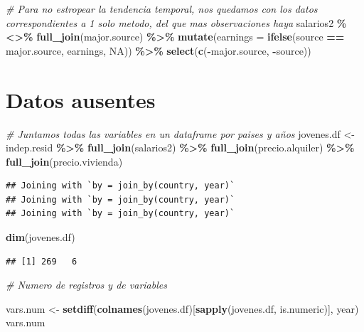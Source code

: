 \documentclass[water,article,submit,pdftex,moreauthors]{Definitions/mdpi}
\newenvironment{Shaded}{\begin{snugshade}}{\end{snugshade}}
\newcommand{\AttributeTok}[1]{\textcolor[rgb]{0.13,0.29,0.53}{#1}}
\newcommand{\CommentTok}[1]{\textcolor[rgb]{0.56,0.35,0.01}{\textit{#1}}}
\newcommand{\ConstantTok}[1]{\textcolor[rgb]{0.56,0.35,0.01}{#1}}
\newcommand{\FunctionTok}[1]{\textcolor[rgb]{0.13,0.29,0.53}{\textbf{#1}}}
\newcommand{\NormalTok}[1]{#1}
\newcommand{\OtherTok}[1]{\textcolor[rgb]{0.56,0.35,0.01}{#1}}
\newcommand{\SpecialCharTok}[1]{\textcolor[rgb]{0.81,0.36,0.00}{\textbf{#1}}}
\newcommand{\StringTok}[1]{\textcolor[rgb]{0.31,0.60,0.02}{#1}}
\begin{document}
\begin{Shaded}
\begin{Highlighting}[]
\CommentTok{\# Para no estropear la tendencia temporal, nos quedamos con los datos correspondientes a 1 solo metodo, del que mas observaciones haya}
\NormalTok{salarios2 }\SpecialCharTok{\%\textless{}\textgreater{}\%} \FunctionTok{full\_join}\NormalTok{(major.source) }\SpecialCharTok{\%\textgreater{}\%} \FunctionTok{mutate}\NormalTok{(}\AttributeTok{earnings =} \FunctionTok{ifelse}\NormalTok{(source }\SpecialCharTok{==}\NormalTok{ major.source, earnings, }\ConstantTok{NA}\NormalTok{)) }\SpecialCharTok{\%\textgreater{}\%} \FunctionTok{select}\NormalTok{(}\FunctionTok{c}\NormalTok{(}\SpecialCharTok{{-}}\NormalTok{major.source, }\SpecialCharTok{{-}}\NormalTok{source))}
\end{Highlighting}
\end{Shaded}

\section{Datos ausentes}\label{datos-ausentes}

\begin{Shaded}
\begin{Highlighting}[]
\CommentTok{\# Juntamos todas las variables en un dataframe por paises y años}
\NormalTok{jovenes.df }\OtherTok{\textless{}{-}}\NormalTok{ indep.resid }\SpecialCharTok{\%\textgreater{}\%} \FunctionTok{full\_join}\NormalTok{(salarios2) }\SpecialCharTok{\%\textgreater{}\%} \FunctionTok{full\_join}\NormalTok{(precio.alquiler) }\SpecialCharTok{\%\textgreater{}\%} \FunctionTok{full\_join}\NormalTok{(precio.vivienda) }
\end{Highlighting}
\end{Shaded}

\begin{verbatim}
## Joining with `by = join_by(country, year)`
## Joining with `by = join_by(country, year)`
## Joining with `by = join_by(country, year)`
\end{verbatim}

\begin{Shaded}
\begin{Highlighting}[]
\FunctionTok{dim}\NormalTok{(jovenes.df)}
\end{Highlighting}
\end{Shaded}

\begin{verbatim}
## [1] 269   6
\end{verbatim}

\begin{Shaded}
\begin{Highlighting}[]
\CommentTok{\# Numero de registros y de variables}

\NormalTok{vars.num }\OtherTok{\textless{}{-}} \FunctionTok{setdiff}\NormalTok{(}\FunctionTok{colnames}\NormalTok{(jovenes.df)[}\FunctionTok{sapply}\NormalTok{(jovenes.df, is.numeric)], }\StringTok{\textquotesingle{}year\textquotesingle{}}\NormalTok{)}
\NormalTok{vars.num}
\end{Highlighting}
\end{Shaded}
\end{document}
